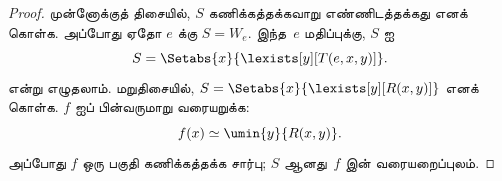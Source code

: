 \documentclass[../../../include/open-logic-section]{subfiles}
\begin{document}
\begin{proof}
முன்னோக்குத் திசையில், $S$ கணிக்கத்தக்கவாறு எண்ணிடத்தக்கது எனக்
கொள்க. அப்போது ஏதோ $e$ க்கு $S = W_e$. இந்த~$e$ மதிப்புக்கு,
$S$ ஐ
\[
S = \Setabs{ x }{ \lexists[y][T(e, x, y)] }.
\]
என்று எழுதலாம். மறுதிசையில்,
$S = \Setabs{ x }{ \lexists[y][R(x, y)] }$ எனக் கொள்க.
$f$ ஐப் பின்வருமாறு வரையறுக்க:
\[
f(x) \simeq \umin{y}{R(x, y)}.
\]
அப்போது $f$ ஒரு பகுதி கணிக்கத்தக்க சார்பு; $S$ ஆனது~$f$ இன்
வரையறைப்புலம்.
\end{proof}
\end{document}
